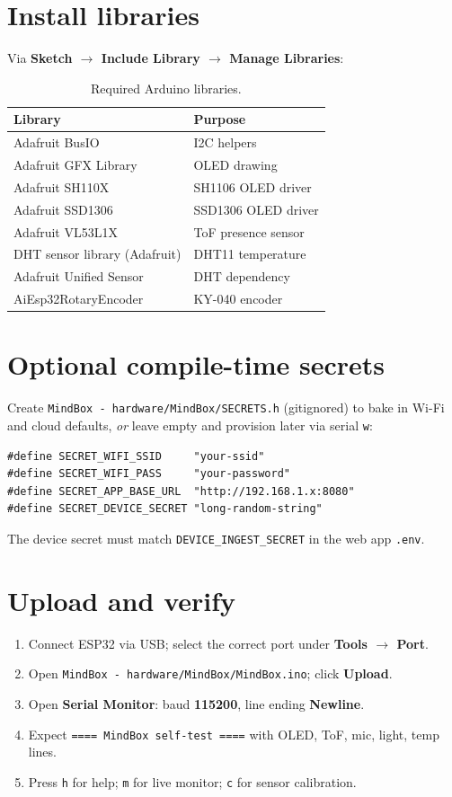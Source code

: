\documentclass[11pt,a4paper]{report}
\newcommand{\filepath}[1]{\texttt{#1}}
\begin{document}
\section{Install libraries}

Via \textbf{Sketch $\rightarrow$ Include Library $\rightarrow$ Manage Libraries}:

\begin{table}[h]
\centering
\caption{Required Arduino libraries.}
\begin{tabular}{@{}ll@{}}
\toprule
\textbf{Library} & \textbf{Purpose} \\
\midrule
Adafruit BusIO & I2C helpers \\
Adafruit GFX Library & OLED drawing \\
Adafruit SH110X & SH1106 OLED driver \\
Adafruit SSD1306 & SSD1306 OLED driver \\
Adafruit VL53L1X & ToF presence sensor \\
DHT sensor library (Adafruit) & DHT11 temperature \\
Adafruit Unified Sensor & DHT dependency \\
AiEsp32RotaryEncoder & KY-040 encoder \\
\bottomrule
\end{tabular}
\end{table}

\section{Optional compile-time secrets}

Create \filepath{MindBox - hardware/MindBox/SECRETS.h} (gitignored) to bake in Wi-Fi and cloud
defaults, \emph{or} leave empty and provision later via serial \texttt{w}:
\begin{lstlisting}
#define SECRET_WIFI_SSID     "your-ssid"
#define SECRET_WIFI_PASS     "your-password"
#define SECRET_APP_BASE_URL  "http://192.168.1.x:8080"
#define SECRET_DEVICE_SECRET "long-random-string"
\end{lstlisting}
The device secret must match \texttt{DEVICE\_INGEST\_SECRET} in the web app \filepath{.env}.

\section{Upload and verify}

\begin{enumerate}[leftmargin=*]
  \item Connect ESP32 via USB; select the correct port under \textbf{Tools $\rightarrow$ Port}.
  \item Open \filepath{MindBox - hardware/MindBox/MindBox.ino}; click \textbf{Upload}.
  \item Open \textbf{Serial Monitor}: baud \textbf{115200}, line ending \textbf{Newline}.
  \item Expect \texttt{==== MindBox self-test ====} with OLED, ToF, mic, light, temp lines.
  \item Press \texttt{h} for help; \texttt{m} for live monitor; \texttt{c} for sensor calibration.
\end{enumerate}
\end{document}
